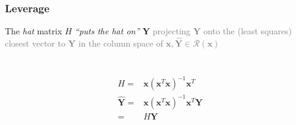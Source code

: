 \documentclass[xcolor={dvipsnames}]{beamer}
\begin{document}
\frame
{
 \frametitle{Leverage  }
The \emph{hat} matrix $H$ \emph{``puts the hat on''} ${\boldsymbol Y}$ \textcolor{gray}{projecting ${\boldsymbol Y}$ onto the (least squares) closest vector to ${\boldsymbol Y}$ in the column space of $\boldsymbol x, \hat {\boldsymbol Y} \in \mathcal{R}(\boldsymbol x)$  }

\begin{columns}
\begin{column}{.01\textwidth}
$\;$
\end{column}
\begin{column}{.275\textwidth}
\begin{align*}
\\{}\\
H = {} & \textbf{x}(\textbf{x}^T\textbf{x})^{-1}  \textbf{x}^T\\
\hat {\boldsymbol Y}  = {} & \textbf{x}(\textbf{x}^T\textbf{x})^{-1}  \textbf{x}^T\textbf{Y}\\
 = {} & H\textbf{Y}\\{}\\{}\\
\end{align*}
\end{column}
\begin{column}{.7\textwidth}
\\${}$
\end{column}
\end{columns}

}
\end{document}
